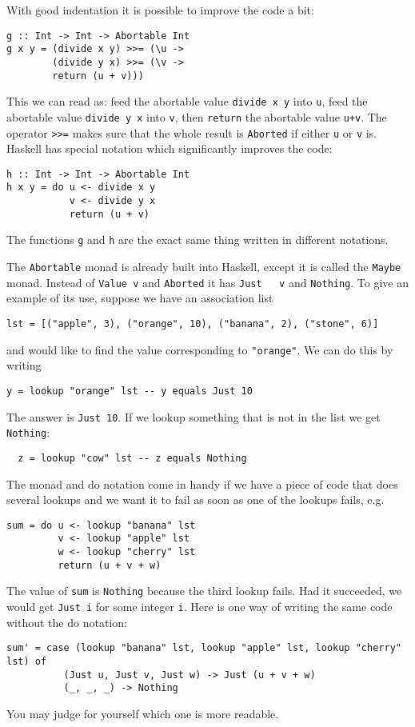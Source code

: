 \documentclass[a4paper,10pt]{article}
\newcommand{\cc}[1]{\lstinline{#1}}
\begin{document}
% 
With good indentation it is possible to improve the code a bit:
% 
\begin{lstlisting}
g :: Int -> Int -> Abortable Int
g x y = (divide x y) >>= (\u ->
        (divide y x) >>= (\v ->
        return (u + v)))
\end{lstlisting}
% 
This we can read as: feed the abortable value \cc{divide x y} into \cc{u},
feed the abortable value \cc{divide y x} into \cc{v}, then \cc{return} the
abortable value \cc{u+v}. The operator \cc{>>=} makes sure that the whole
result is \cc{Aborted} if either \cc{u} or \cc{v} is. Haskell has special
notation which significantly improves the code:
% 
\begin{lstlisting}
h :: Int -> Int -> Abortable Int
h x y = do u <- divide x y
           v <- divide y x
           return (u + v)
\end{lstlisting}
% 
The functions \cc{g} and \cc{h} are the exact same thing written in different
notations.

The \cc{Abortable} monad is already built into Haskell, except it is called
the \cc{Maybe} monad. Instead of \cc{Value v} and \cc{Aborted} it has \cc{Just
  v} and \cc{Nothing}. To give an example of its use, suppose we have an
association list
% 
\begin{lstlisting}
lst = [("apple", 3), ("orange", 10), ("banana", 2), ("stone", 6)]
\end{lstlisting}
% 
and would like to find the value corresponding to \cc{"orange"}. We can do
this by writing
% 
\begin{lstlisting}
y = lookup "orange" lst -- y equals Just 10
\end{lstlisting}
% 
The answer is \cc{Just 10}. If we lookup something that is not in the list we
get \cc{Nothing}:
% 
\begin{lstlisting}
  z = lookup "cow" lst -- z equals Nothing
\end{lstlisting}
% 
The monad and do notation come in handy if we have a piece of code that does
several lookups and we want it to fail as soon as one of the lookups fails,
e.g.
% 
\begin{lstlisting}
sum = do u <- lookup "banana" lst
         v <- lookup "apple" lst
         w <- lookup "cherry" lst
         return (u + v + w)
\end{lstlisting}
% 
The value of \cc{sum} is \cc{Nothing} because the third lookup fails. Had it
succeeded, we would get \cc{Just i} for some integer \cc{i}. Here is one way
of writing the same code without the do notation:
% 
\begin{lstlisting}
sum' = case (lookup "banana" lst, lookup "apple" lst, lookup "cherry" lst) of
          (Just u, Just v, Just w) -> Just (u + v + w)
          (_, _, _) -> Nothing
\end{lstlisting}
% 
You may judge for yourself which one is more readable.
\end{document}
